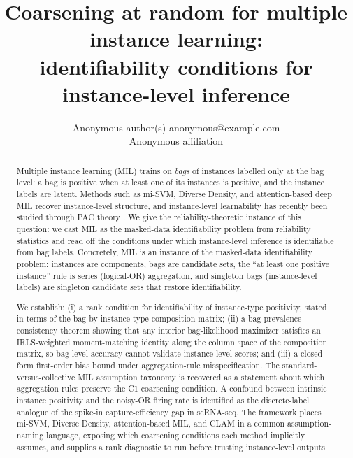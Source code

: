 \documentclass[10pt]{article}
\title{Coarsening at random for multiple instance learning:\\
       identifiability conditions for instance-level inference}
\author{\name Anonymous author(s) \email anonymous@example.com \\
        \addr Anonymous affiliation}
\theoremstyle{plain}
\theoremstyle{definition}
\theoremstyle{remark}
\newcommand{\1}{\mathbf{1}}
\begin{document}
\maketitle

\begin{abstract}
Multiple instance learning (MIL) trains on \emph{bags} of instances
labelled only at the bag level: a bag is positive when at least one
of its instances is positive, and the instance labels are latent.
Methods such as mi-SVM, Diverse Density, and attention-based deep MIL
recover instance-level structure, and instance-level learnability has
recently been studied through PAC theory \citep{jang2024learnable}. We
give the reliability-theoretic instance of this question: we cast MIL
as the masked-data identifiability problem from reliability statistics
and read off the conditions under which instance-level inference is
identifiable from bag labels. Concretely, MIL is an instance of the
masked-data identifiability problem:
instances are components, bags are candidate sets, the ``at least
one positive instance'' rule is series (logical-OR) aggregation, and
singleton bags (instance-level labels) are singleton candidate sets
that restore identifiability.

We establish: (i) a rank condition for identifiability of
instance-type positivity, stated in terms of the
bag-by-instance-type composition matrix; (ii) a bag-prevalence
consistency theorem showing that any interior bag-likelihood
maximizer satisfies an IRLS-weighted moment-matching identity
along the column space of the composition matrix, so bag-level
accuracy cannot validate instance-level scores; and (iii) a
closed-form first-order bias bound under aggregation-rule
misspecification. The standard-versus-collective MIL assumption
taxonomy is recovered as a statement about which aggregation rules
preserve the C1 coarsening condition. A confound between intrinsic
instance positivity and the noisy-OR firing rate is identified as
the discrete-label analogue of the spike-in capture-efficiency gap
in scRNA-seq. The framework places mi-SVM, Diverse Density,
attention-based MIL, and CLAM in a common assumption-naming language,
exposing which coarsening conditions each method implicitly assumes,
and supplies a rank diagnostic to run before trusting instance-level
outputs.
\end{abstract}














\end{document}
